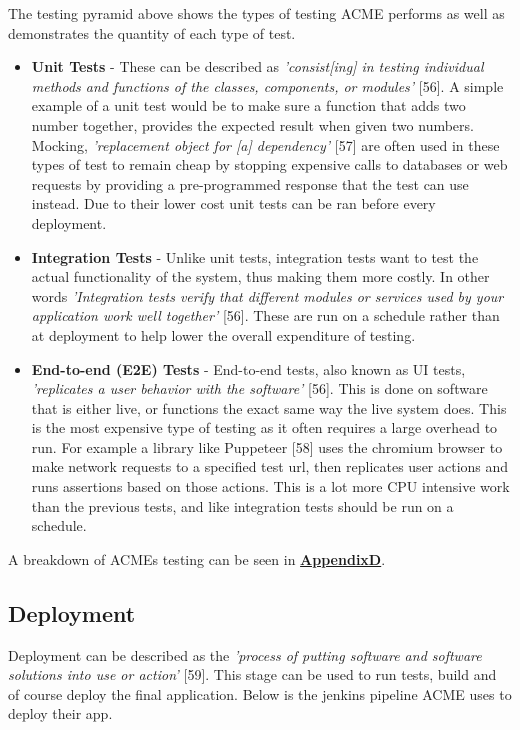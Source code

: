   The testing pyramid above shows the types of testing ACME performs as well as demonstrates the quantity of each type of test.
  \begin{itemize}
    \item \textbf{Unit Tests} - These can be described as \textit{'consist[ing] in testing individual methods and functions of the classes, components, 
    or modules'} [56]. A simple example of a unit test would be to make sure a function that adds two number together, provides the expected result
    when given two numbers. Mocking, \textit{'replacement object for [a] dependency'} [57] are often used in these types of test to remain cheap by
    stopping expensive calls to databases or web requests by providing a pre-programmed response that the test can use instead. Due to their 
    lower cost unit tests can be ran before every deployment.

    \item \textbf{Integration Tests} - Unlike unit tests, integration tests want to test the actual functionality of the system, thus 
    making them more costly. In other words \textit{'Integration tests verify that different modules or services used by your application work well
    together'} [56]. These are run on a schedule rather than at deployment to help lower the overall expenditure of testing. 
  
    \item \textbf{End-to-end (E2E) Tests} - End-to-end tests, also known as UI tests, \textit{'replicates a user behavior with the software'} [56].
    This is done on software that is either live, or functions the exact same way the live system does. This is the most expensive type of testing as
    it often requires a large overhead to run. For example a library like Puppeteer [58] uses the chromium browser to make network requests to a 
    specified test url, then replicates user actions and runs assertions based on those actions. This is a lot more CPU intensive work than the 
    previous tests, and like integration tests should be run on a schedule.
  \end{itemize}

  A breakdown of ACMEs testing can be seen in \hyperref[sec:AppendixD]{\textbf{AppendixD}}.

  \subsection{Deployment}
  \label{sec:Deployment}

  Deployment can be described as the \textit{'process of putting software and software solutions into use or action'} [59]. This stage can be
  used to run tests, build and of course deploy the final application. Below is the jenkins pipeline ACME uses to deploy their app.

